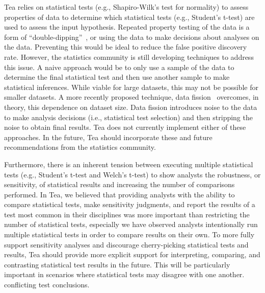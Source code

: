 Tea relies on statistical tests (e.g., Shapiro-Wilk's test for normality) to
assess properties of data to determine which statistical tests (e.g., Student's
t-test) are used to assess the input hypothesis. Repeated property testing of
the data is a form of ``double-dipping''~\cite{}, or using the data to make
decisions about analyses on the data. Preventing this would be ideal to reduce
the false positive discovery rate. However, the statistics community is still
developing techniques to address this issue. A naive approach would be to only
use a sample of the data to determine the final statistical test and then use
another sample to make statistical inferences. While viable for large datasets,
this may not be possible for smaller datasets. A more recently proposed
technique, data fission~\cite{} overcomes, in theory, this dependence on dataset
size.  Data fission introduces noise to the data to make analysis decisions
(i.e., statistical test selection) and then stripping the noise to obtain final
results. Tea does not currently implement either of these approaches. In the
future, Tea should incorporate these and future recommendations from the
statistics community. 

Furthermore, there is an inherent tension between executing multiple statistical
tests (e.g., Student's t-test and Welch's t-test) to show analysts the
robustness, or sensitivity, of statistical results and increasing the number of
comparisons performed. In Tea, we believed that providing analysts with the
ability to compare statistical tests, make sensitivity judgments, and report the
results of a test most common in their disciplines was more important than
restricting the number of statistical tests, especially we have observed
analysts intentionally run multiple statistical tests in order to compare
results on their own. To more fully support sensitivity analyses and discourage
cherry-picking statistical tests and results, Tea should provide more explicit
support for interpreting, comparing, and contrasting statistical test results in
the future. This will be particularly important in scenarios where statistical
tests may disagree with one another. conflicting test conclusions. 



